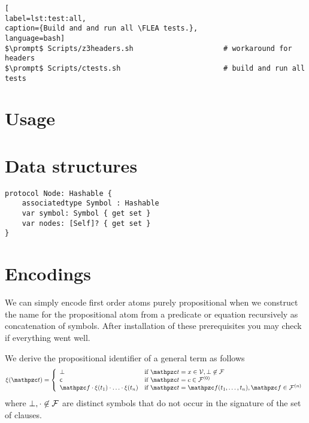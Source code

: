 \begin{lstlisting}[
label=lst:test:all,
caption={Build and and run all \FLEA tests.},
language=bash]
$\prompt$ Scripts/z3headers.sh                     # workaround for headers
$\prompt$ Scripts/ctests.sh                        # build and run all tests
\end{lstlisting}


\section{Usage}\label{sec:flea:usage}

\section{Data structures}\label{sec:flea:details}

\begin{lstlisting}[language=flea, caption={Simplified definition of general terms}]
protocol Node: Hashable {
	associatedtype Symbol : Hashable
	var symbol: Symbol { get set }
	var nodes: [Self]? { get set }
}
\end{lstlisting}

\section{Encodings}\label{sec:flea:encodings}


We can simply encode first order atoms purely propositional
when we construct the name for the propositional atom
from a predicate or equation recursively as concatenation of symbols.
After installation of these prerequisites you may check if everything went well.



\begin{definition}
	We derive the propositional identifier of a general term as follows
\begin{gather*}
	\MDEFINE{\xi(\mct)}{ll}{
	\bot &\text{if } \mct=x\in\mcV, \bot\not\in\mcF
	\tag*{}\\
	\mc &\text{if } \mct=c\in\mcFn[0]\\
	\mcf\encsep\xi(t_1)\encsep\ldots\encsep\xi(t_n) &\text{if }\mct=\mcf(t_1,\ldots,t_n), \mcf\in\mcFn
}
\end{gather*}
where \( \bot, \cdot\not\in\mathcal{F} \) are distinct symbols that do not occur in the signature of the set of clauses.
\end{definition}

